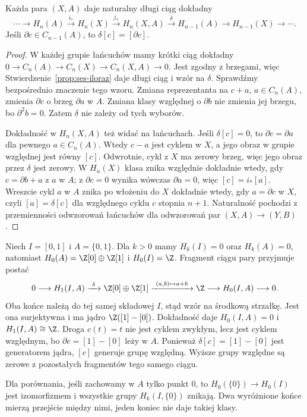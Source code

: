 \begin{twierdzenie}
\label{thm:les-pary}
Każda para $(X,A)$ daje naturalny
długi ciąg dokładny
\begin{equation}\label{eq:les-pary}
 \cdots\to H_n(A)\xrightarrow{i_*}H_n(X)
 \xrightarrow{j_*}H_n(X,A)
 \xrightarrow{\delta}H_{n-1}(A)
 \to H_{n-1}(X)\to\cdots.
\end{equation}
Jeśli $\partial c\in C_{n-1}(A)$,
to $\delta[c]=[\partial c]$.
\end{twierdzenie}
\begin{proof}
W każdej grupie łańcuchów mamy
krótki ciąg dokładny
$0\to C_n(A)\to C_n(X)\to C_n(X,A)\to0$.
Jest zgodny z brzegami, więc
Stwierdzenie~\ref{prop:ses-iloraz}
daje długi ciąg i wzór na $\delta$.
Sprawdźmy bezpośrednio znaczenie tego wzoru. Zmiana reprezentanta
na $c+a$, $a\in C_n(A)$, zmienia $\partial c$ o brzeg $\partial a$
w $A$. Zmiana klasy względnej o $\partial b$ nie zmienia jej brzegu,
bo $\partial^2b=0$. Zatem $\delta$ nie zależy od tych wyborów.

Dokładność w $H_n(X,A)$ też widać na łańcuchach. Jeśli
$\delta[c]=0$, to $\partial c=\partial a$ dla pewnego
$a\in C_n(A)$. Wtedy $c-a$ jest cyklem w $X$, a jego obraz
w grupie względnej jest równy $[c]$.
Odwrotnie, cykl z $X$ ma zerowy brzeg, więc jego obraz przez
$\delta$ jest zerowy. W $H_n(X)$ klasa znika względnie
dokładnie wtedy, gdy $c=\partial b+a$ z $a$ w $A$;
z $\partial c=0$ wynika wówczas $\partial a=0$, więc
$[c]=i_*[a]$. Wreszcie cykl $a$ w $A$ znika po włożeniu do $X$
dokładnie wtedy, gdy $a=\partial c$ w $X$, czyli
$[a]=\delta[c]$ dla względnego cyklu $c$ stopnia $n+1$.
Naturalność pochodzi z przemienności
odwzorowań łańcuchów dla odwzorowań
par $(X,A)\to(Y,B)$.
\end{proof}

\begin{przyklad}
\label{prz:para-odcinek-konce}
Niech $I=[0,1]$ i $A=\{0,1\}$. Dla $k>0$ mamy $H_k(I)=0$
oraz $H_k(A)=0$, natomiast $H_0(A)=\Z[0]\oplus\Z[1]$
i $H_0(I)=\Z$. Fragment ciągu pary przyjmuje postać
\[
 0\longrightarrow H_1(I,A)\xrightarrow{\ \delta\ }
 \Z[0]\oplus\Z[1]\xrightarrow{\ (a,b)\mapsto a+b\ }
 \Z\longrightarrow H_0(I,A)\longrightarrow0.
\]
Oba końce należą do tej samej składowej $I$, stąd wzór
na środkową strzałkę. Jest ona surjektywna i ma jądro
$\Z([1]-[0])$. Dokładność daje $H_0(I,A)=0$ i
$H_1(I,A)\cong\Z$. Droga $c(t)=t$ nie jest cyklem zwykłym,
lecz jest cyklem względnym, bo $\partial c=[1]-[0]$ leży w $A$.
Ponieważ $\delta[c]=[1]-[0]$ jest generatorem jądra,
$[c]$ generuje grupę względną. Wyższe grupy względne są zerowe
z pozostałych fragmentów tego samego ciągu.

Dla porównania, jeśli zachowamy w $A$ tylko punkt $0$,
to $H_0(\{0\})\to H_0(I)$ jest izomorfizmem i wszystkie
grupy $H_k(I,\{0\})$ znikają. Dwa wyróżnione końce mierzą
przejście między nimi, jeden koniec nie daje takiej klasy.
\end{przyklad}

